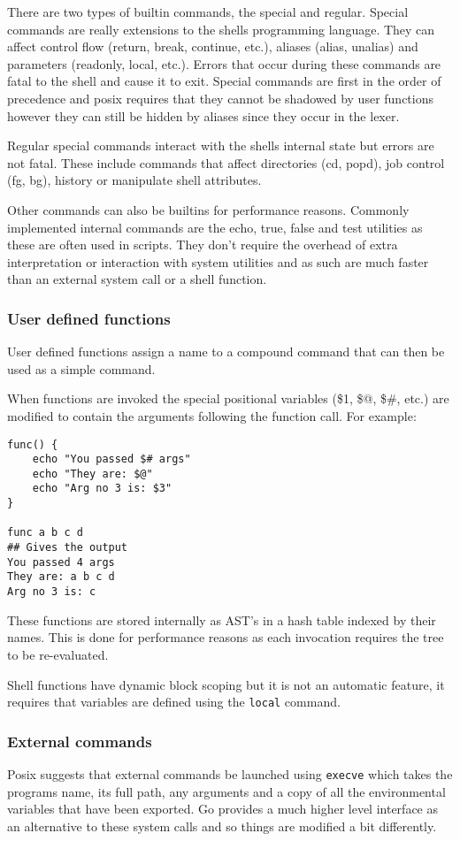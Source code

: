 There are two types of builtin commands, the special and regular.
Special commands are really extensions to the shells programming language.
They can affect control flow (return, break, continue, etc.), aliases (alias, unalias) and parameters (readonly, local, etc.).
Errors that occur during these commands are fatal to the shell and cause it to exit.
Special commands are first in the order of precedence and posix requires that they cannot be shadowed by user functions however they can still be hidden by aliases since they occur in the lexer.

Regular special commands interact with the shells internal state but errors are not fatal.
These include commands that affect directories (cd, popd), job control (fg, bg), history or manipulate shell attributes.

Other commands can also be builtins for performance reasons.
Commonly implemented internal commands are the echo, true, false and test utilities as these are often used in scripts.
They don't require the overhead of extra interpretation or interaction with system utilities and as such are much faster than an external system call or a shell function.

\subsubsection{User defined functions}
User defined functions assign a name to a compound command that can then be used as a simple command.

When functions are invoked the special positional variables (\$1, \$@, \$\#, etc.) are modified to contain the arguments following the function call. For example:
\begin{verbatim}
func() {
	echo "You passed $# args"
    echo "They are: $@"
    echo "Arg no 3 is: $3"
}

func a b c d
## Gives the output
You passed 4 args
They are: a b c d
Arg no 3 is: c
\end{verbatim}
These functions are stored internally as AST's in a hash table indexed by their names.
This is done for performance reasons as each invocation requires the tree to be re-evaluated.

Shell functions have dynamic block scoping but it is not an automatic feature, it requires that variables are defined using the \verb!local! command.

\subsubsection{External commands}
Posix suggests that external commands be launched using \verb!execve! which takes the programs name, its full path, any arguments and a copy of all the environmental variables that have been exported.
Go provides a much higher level interface as an alternative to these system calls and so things are modified a bit differently.

